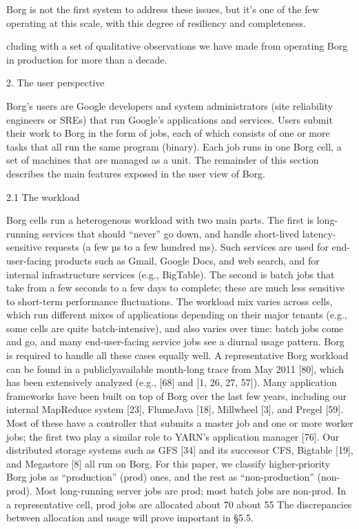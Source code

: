 Borg is not the first system to address these issues, but it’s one of the few
operating at this scale, with this degree of resiliency and completeness.

cluding with a set of qualitative observations we have made from operating Borg
in production for more than a decade.

2. The user perspective

Borg’s users are Google developers and system administrators (site reliability
engineers or SREs) that run Google’s applications and services.
Users submit their work to Borg in the form of jobs, each of which consists of
one or more tasks that all run the same program (binary).
Each job runs in one Borg cell, a set of machines that are managed as a unit.
The remainder of this section describes the main features exposed in the user
view of Borg.

2.1 The workload

Borg cells run a heterogenous workload with two main parts. 
The first is long-running services that should “never” go down, and handle
short-lived latency-sensitive requests (a few µs to a few hundred ms).
Such services are used for end-user-facing products such as Gmail, Google Docs,
and web search, and for internal infrastructure services (e.g., BigTable).
The second is batch jobs that take from a few seconds to a few days to
complete; these are much less sensitive to short-term performance fluctuations.
The workload mix varies across cells, which run different mixes of applications
depending on their major tenants (e.g., some cells are quite batch-intensive),
and also varies over time: batch jobs come and go, and many end-user-facing
service jobs see a diurnal usage pattern.
Borg is required to handle all these cases equally well.
A representative Borg workload can be found in a publiclyavailable month-long
trace from May 2011 [80], which has been extensively analyzed (e.g., [68] and
[1, 26, 27, 57]).
Many application frameworks have been built on top of Borg over the last few
years, including our internal MapReduce system [23], FlumeJava [18], Millwheel
[3], and Pregel [59]. 
Most of these have a controller that submits a master job and one or more worker
jobs; the first two play a similar role to YARN’s application manager [76].
Our distributed storage systems such as GFS [34] and its successor CFS, Bigtable
[19], and Megastore [8] all run on Borg.
For this paper, we classify higher-priority Borg jobs as “production” (prod)
ones, and the rest as “non-production” (non-prod).
Most long-running server jobs are prod; most batch jobs are non-prod.
In a representative cell, prod jobs are allocated about 70%
about 55%
The discrepancies between allocation and usage will prove important in §5.5.

